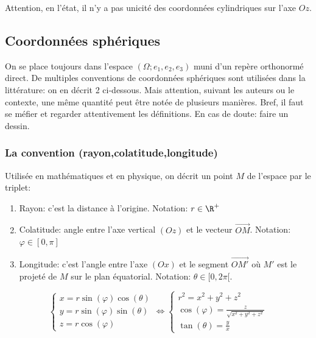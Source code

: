 Attention, en l'état, il n'y a pas unicité des coordonnées cylindriques sur l'axe $Oz$.
\sld{\vfill\pagebreak[5]}%
\subsection{Coordonnées sphériques}

On se place toujours dans l'espace $(\Omega;e_1,e_2,e_3)$ muni d'un repère  orthonormé direct. De multiples conventions de coordonnées sphériques sont utilisées dans la littérature: on en décrit 2 ci-dessous. Mais attention, suivant les auteurs ou le contexte, une même quantité peut être notée de plusieurs manières. Bref, il faut se méfier et regarder attentivement les définitions. En cas de doute: faire un dessin.

\subsubsection{La convention (rayon,colatitude,longitude)}

Utilisée en mathématiques et en physique, on décrit un point $M$ de l'espace par le triplet: 
\begin{enumerate}
\item Rayon: c'est la distance à l'origine. Notation: $r \in \R^+$
\item Colatitude: angle entre l'axe vertical $(Oz)$ et le vecteur $\overrightarrow{OM}$. Notation: $\varphi \in [0,\pi]$
\item Longitude: c'est l'angle entre l'axe $(Ox)$ et le segment $\overrightarrow{OM'}$ où $M'$ est le projeté de $M$ sur le plan équatorial. Notation: $\theta \in [0,2\pi[$.
\end{enumerate}
\[
	\begin{cases}
		x = r\sin(\varphi) \cos(\theta)\\
		y = r \sin(\varphi) \sin(\theta)\\
	        z = r \cos(\varphi)
	\end{cases}
\Leftrightarrow
\begin{cases}
	r^2 = x^2+y^2+z^2 \\
	\cos(\varphi) = \frac{z}{\sqrt{x^2+y^2+z^2} } \\
	\tan(\theta) = \frac y x
\end{cases}
\]

